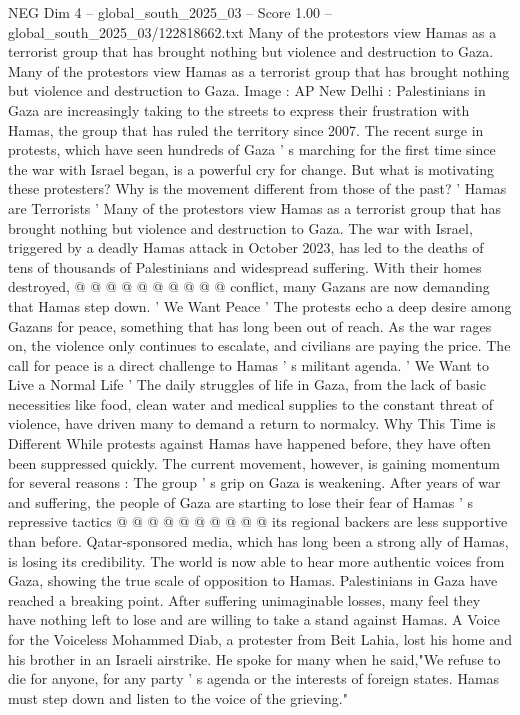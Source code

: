\begin{textsample}{NEG Dim 4 – global\_south\_2025\_03 – Score 1.00 – global\_south\_2025\_03/122818662.txt}  \label{ex:f4_neg_427}
Many of the protestors view Hamas as a terrorist group that has brought nothing but violence and destruction to Gaza.
Many of the protestors view Hamas as a terrorist group that has brought nothing but violence and destruction to Gaza.
Image : AP New Delhi : Palestinians in Gaza are increasingly taking to the streets to express their frustration with Hamas, the group that has ruled the territory since 2007.
The recent surge in protests, which have seen hundreds of Gaza ' s marching for the first time since the war with Israel began, is a powerful cry for change.
But what is motivating these protesters?
Why is the movement different from those of the past? ' Hamas are Terrorists ' Many of the protestors view Hamas as a terrorist group that has brought nothing but violence and destruction to Gaza.
The war with Israel, triggered by a deadly Hamas attack in October 2023, has led to the deaths of tens of thousands of Palestinians and widespread suffering.
With their homes destroyed, @ @ @ @ @ @ @ @ @ @ conflict, many Gazans are now demanding that Hamas step down. ' We Want Peace ' The protests echo a deep desire among Gazans for peace, something that has long been out of reach.
As the war rages on, the violence only continues to escalate, and civilians are paying the price.
The call for peace is a direct challenge to Hamas ' s militant agenda. ' We Want to Live a Normal Life ' The daily struggles of life in Gaza, from the lack of basic necessities like food, clean water and medical supplies to the constant threat of violence, have driven many to demand a return to normalcy.
Why This Time is Different While protests against Hamas have happened before, they have often been suppressed quickly.
The current movement, however, is gaining momentum for several reasons : The group ' s grip on Gaza is weakening.
After years of war and suffering, the people of Gaza are starting to lose their fear of Hamas ' s repressive tactics @ @ @ @ @ @ @ @ @ @ its regional backers are less supportive than before.
Qatar-sponsored media, which has long been a strong ally of Hamas, is losing its credibility.
The world is now able to hear more authentic voices from Gaza, showing the true scale of opposition to Hamas.
Palestinians in Gaza have reached a breaking point.
After suffering unimaginable losses, many feel they have nothing left to lose and are willing to take a stand against Hamas.
A Voice for the Voiceless Mohammed Diab, a protester from Beit Lahia, lost his home and his brother in an Israeli airstrike.
He spoke for many when he said,"We refuse to die for anyone, for any party ' s agenda or the interests of foreign states.
Hamas must step down and listen to the voice of the grieving."

\end{textsample}
